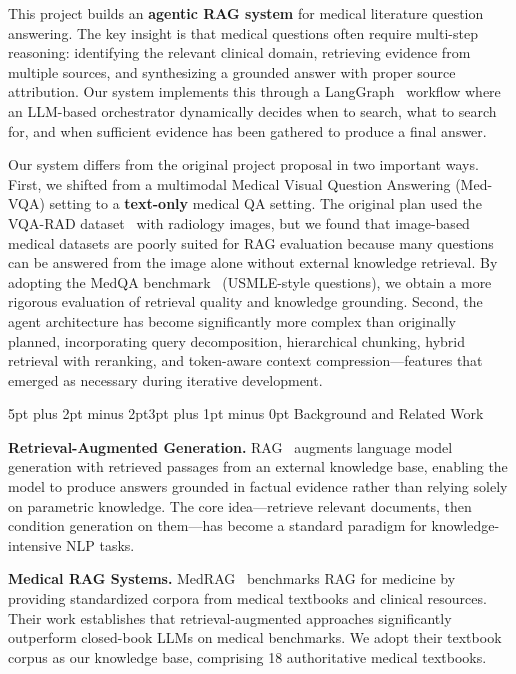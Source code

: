 \documentclass[10pt,twocolumn,letterpaper]{article}
\makeatletter
\renewcommand\section{\@startsection{section}{1}{\z@}%
  {5pt plus 2pt minus 2pt}{3pt plus 1pt minus 0pt}%
  {\large\bfseries}}
\makeatother
\begin{document}
This project builds an \textbf{agentic RAG system} for medical literature question answering. The key insight is that medical questions often require multi-step reasoning: identifying the relevant clinical domain, retrieving evidence from multiple sources, and synthesizing a grounded answer with proper source attribution. Our system implements this through a LangGraph~\cite{langgraph} workflow where an LLM-based orchestrator dynamically decides when to search, what to search for, and when sufficient evidence has been gathered to produce a final answer.

Our system differs from the original project proposal in two important ways. First, we shifted from a multimodal Medical Visual Question Answering (Med-VQA) setting to a \textbf{text-only} medical QA setting. The original plan used the VQA-RAD dataset~\cite{lau2018dataset} with radiology images, but we found that image-based medical datasets are poorly suited for RAG evaluation because many questions can be answered from the image alone without external knowledge retrieval. By adopting the MedQA benchmark~\cite{jin2021disease} (USMLE-style questions), we obtain a more rigorous evaluation of retrieval quality and knowledge grounding. Second, the agent architecture has become significantly more complex than originally planned, incorporating query decomposition, hierarchical chunking, hybrid retrieval with reranking, and token-aware context compression---features that emerged as necessary during iterative development.

\section{Background and Related Work}

\textbf{Retrieval-Augmented Generation.} RAG~\cite{lewis2020retrieval} augments language model generation with retrieved passages from an external knowledge base, enabling the model to produce answers grounded in factual evidence rather than relying solely on parametric knowledge. The core idea---retrieve relevant documents, then condition generation on them---has become a standard paradigm for knowledge-intensive NLP tasks.

\textbf{Medical RAG Systems.} MedRAG~\cite{xiong2024benchmarking} benchmarks RAG for medicine by providing standardized corpora from medical textbooks and clinical resources. Their work establishes that retrieval-augmented approaches significantly outperform closed-book LLMs on medical benchmarks. We adopt their textbook corpus as our knowledge base, comprising 18 authoritative medical textbooks.
\end{document}
